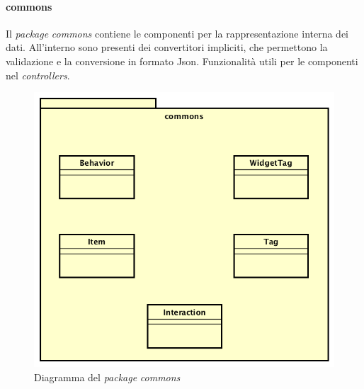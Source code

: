 \paragraph*{commons}
Il \emph{package} \emph{commons} contiene le componenti per la rappresentazione interna dei dati. All'interno sono presenti dei convertitori impliciti, che permettono la validazione e la conversione in formato Json. Funzionalità utili per le componenti nel \emph{controllers}. 
\begin{figure}[h]
\centering
\includegraphics[scale=0.28]{immagini/commons}
\caption{Diagramma del \emph{package} \emph{commons}}
\label{fig:pack-commons}
\end{figure}
